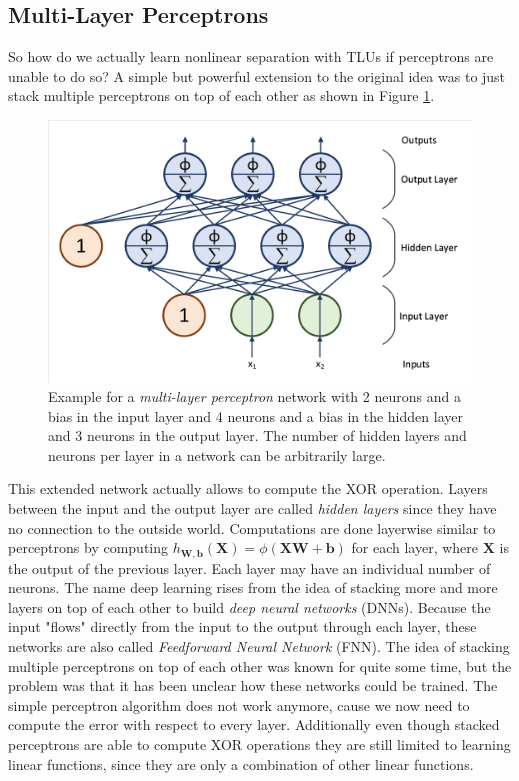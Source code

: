 \subsection{Multi-Layer Perceptrons} \label{ssec:MLPs}
So how do we actually learn nonlinear separation with TLUs if perceptrons are unable to do so? A simple but powerful extension to the original idea was to just stack multiple perceptrons on top of each other as shown in Figure \ref{fig:MLP}. 

\begin{figure}[ht]
  
  \begin{center}
      \includegraphics[trim=10px 10px 10px 10px, clip, width=0.8\columnwidth]{figures/deeplearning/MLP.pdf}
  \end{center}
  
  \caption[Multi-Layer Perceptron Example]{Example for a \textit{multi-layer perceptron} network with 2 neurons and a bias in the input layer and 4 neurons and a bias in the hidden layer and 3 neurons in the output layer. The number of hidden layers and neurons per layer in a network can be arbitrarily large.}
  \label{fig:MLP}
\end{figure}

This extended network actually allows to compute the XOR operation. Layers between the input and the output layer are called \textit{hidden layers} since they have no connection to the outside world. Computations are done layerwise similar to perceptrons by computing $h_{\mathbf{W}, \mathbf{b}}(\mathbf{X}) = \phi(\mathbf{XW} + \mathbf{b})$ for each layer, where $\mathbf{X}$ is the output of the previous layer. Each layer may have an individual number of neurons. The name deep learning rises from the idea of stacking more and more layers on top of each other to build \textit{deep neural networks} (DNNs). Because the input "flows" directly from the input to the output through each layer, these networks are also called \textit{Feedforward Neural Network} (FNN). The idea of stacking multiple perceptrons on top of each other was known for quite some time, but the problem was that it has been unclear how these networks could be trained. The simple perceptron algorithm does not work anymore, cause we now need to compute the error with respect to every layer. Additionally even though stacked perceptrons are able to compute XOR operations they are still limited to learning linear functions, since they are only a combination of other linear functions.

